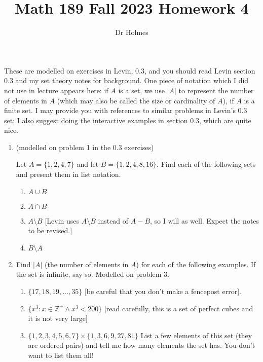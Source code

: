 \documentclass[12pt]{article}
\title{Math 189 Fall 2023 Homework 4}
\author{Dr Holmes}
\begin{document}
\maketitle

These are modelled on exercises in Levin, 0.3, and you should read Levin section 0.3 and my set theory notes for background.  One piece of notation which I did not use in lecture appears here:  if $A$ is a set, we use $|A|$ to represent the number of elements in $A$ (which may also be called the size or cardinality of $A$), if $A$ is a finite set.  I may provide you with references to similar problems in Levin's 0.3 set;  I also suggest doing the interactive examples in section 0.3, which are quite nice.

\begin{enumerate}

\item (modelled on problem 1 in the 0.3 exercises)

Let $A = \{1,2,4,7\}$ and let $B = \{1,2,4,8,16\}$.  Find each of the following sets and present them in list notation.

\begin{enumerate}

\item $A \cup B$

\item $A \cap B$

\item $A \setminus B$  [Levin uses $A \setminus B$ instead of $A - B$, so I will as well.  Expect the notes to be revised.]

\item $B \setminus A$

\end{enumerate}

\item  Find $|A|$ (the number of elements in $A$) for each of the following examples.  If the set is infinite, say so.  Modelled on problem 3.

\begin{enumerate}

\item  $\{17,18,19,\ldots,35\}$ [be careful that you don't make a fencepost error].

\item   $\{x^3:x \in \mathbb Z^+ \wedge x^3<200\}$ [read carefully, this is a set of perfect cubes and it is not very large]

\item  $\{1,2,3,4,5,6,7\} \times \{1,3,6,9,27,81\}$  List a few elements of this set (they are ordered pairs) and tell me how many elements the set has.  You don't want to list them all!


\end{enumerate}
\end{enumerate}
\end{document}
